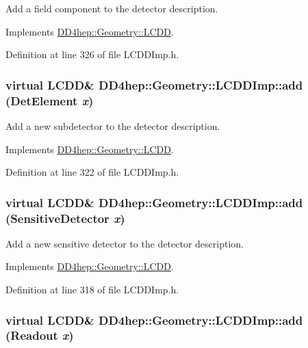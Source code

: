 Add a field component to the detector description. 

Implements \hyperlink{class_d_d4hep_1_1_geometry_1_1_l_c_d_d_a57833b868c0abeb0d1ee43d1895a5996}{DD4hep::Geometry::LCDD}.

Definition at line 326 of file LCDDImp.h.\hypertarget{class_d_d4hep_1_1_geometry_1_1_l_c_d_d_imp_a06e5ca9521c2527da58eded16edce69e}{
\subsubsection[{add}]{\setlength{\rightskip}{0pt plus 5cm}virtual {\bf LCDD}\& DD4hep::Geometry::LCDDImp::add ({\bf DetElement} {\em x})}}
\label{class_d_d4hep_1_1_geometry_1_1_l_c_d_d_imp_a06e5ca9521c2527da58eded16edce69e}


Add a new subdetector to the detector description. 

Implements \hyperlink{class_d_d4hep_1_1_geometry_1_1_l_c_d_d_a9b756dac3f0ebc5393072f23c96cb490}{DD4hep::Geometry::LCDD}.

Definition at line 322 of file LCDDImp.h.\hypertarget{class_d_d4hep_1_1_geometry_1_1_l_c_d_d_imp_a2b9390272a836536b6ffb8545165f0db}{
\subsubsection[{add}]{\setlength{\rightskip}{0pt plus 5cm}virtual {\bf LCDD}\& DD4hep::Geometry::LCDDImp::add ({\bf SensitiveDetector} {\em x})}}
\label{class_d_d4hep_1_1_geometry_1_1_l_c_d_d_imp_a2b9390272a836536b6ffb8545165f0db}


Add a new sensitive detector to the detector description. 

Implements \hyperlink{class_d_d4hep_1_1_geometry_1_1_l_c_d_d_a6c10312be5b4fdf8132e25eae6abdac0}{DD4hep::Geometry::LCDD}.

Definition at line 318 of file LCDDImp.h.\hypertarget{class_d_d4hep_1_1_geometry_1_1_l_c_d_d_imp_a387c7f1ec836f427515add50ca1c51ad}{
\subsubsection[{add}]{\setlength{\rightskip}{0pt plus 5cm}virtual {\bf LCDD}\& DD4hep::Geometry::LCDDImp::add ({\bf Readout} {\em x})}}
\label{class_d_d4hep_1_1_geometry_1_1_l_c_d_d_imp_a387c7f1ec836f427515add50ca1c51ad}


